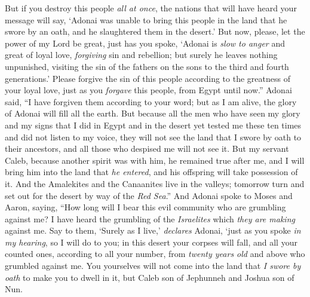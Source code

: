 \begin{biblechapter}
\verse But if you destroy this people \textit{all at once}, the nations that will have heard your message will say,
\verse ‘Adonai was unable to bring this people in the land that he swore by an oath, and he slaughtered them in the desert.’
\verse But now, please, let the power of my Lord be great, just has you spoke,
\verse ‘Adonai is \textit{slow to anger} 
and great of loyal love, 
\textit{forgiving} sin and rebellion; 
but surely he leaves nothing unpunished, 
visiting the sin of the fathers on the sons 
to the third and fourth generations.’
\verse Please forgive the sin of this people according to the greatness of your loyal love, just as you \textit{forgave} this people, from Egypt until now.”
\verse Adonai said, “I have forgiven them according to your word;
\verse but as I am alive, the glory of Adonai will fill all the earth.
\verse But because all the men who have seen my glory and my signs that I did in Egypt and in the desert yet tested me these ten times and did not listen to my voice,
\verse they will not see the land that I swore by oath to their ancestors, and all those who despised me will not see it.
\verse But my servant Caleb, because another spirit was with him, he remained true after me, and I will bring him into the land that \textit{he entered}, and his offspring will take possession of it.
\verse And the Amalekites and the Canaanites live in the valleys; tomorrow turn and set out for the desert by way of the \textit{Red Sea}.”
\verse And Adonai spoke to Moses and Aaron, saying,
\verse “How long will I bear this evil community who are grumbling against me? I have heard the grumbling of the \textit{Israelites} which \textit{they are making} against me.
\verse Say to them, ‘Surely as I live,’ \textit{declares} Adonai, ‘just as you spoke \textit{in my hearing}, so I will do to you;
\verse in this desert your corpses will fall, and all your counted ones, according to all your number, from \textit{twenty years old} and above who grumbled against me.
\verse You yourselves will not come into the land that \textit{I swore by oath} to make you to dwell in it, but Caleb son of Jephunneh and Joshua son of Nun.

\end{biblechapter}
